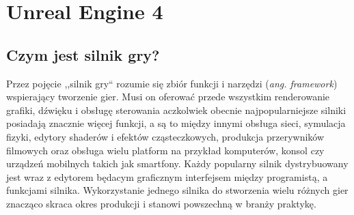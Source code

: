 \documentclass[multip]{SGGW-thesis}
\begin{document}
\chapter{Unreal Engine 4}
\section{Czym jest silnik gry?}
Przez pojęcie ,,silnik gry`` rozumie się zbiór funkcji i narzędzi ({\em ang. framework}) wspierający tworzenie gier. Musi on oferować przede wszystkim renderowanie grafiki, dźwięku i obsługę sterowania aczkolwiek obecnie najpopularniejsze silniki posiadają znacznie więcej funkcji, a są to między innymi obsługa sieci, symulacja fizyki, edytory shaderów i efektów cząsteczkowych, produkcja przerywników filmowych oraz obsługa wielu platform na przykład komputerów, konsol czy urządzeń mobilnych takich jak smartfony. Każdy popularny silnik dystrybuowany jest wraz z edytorem będacym graficznym interfejsem między programistą, a funkcjami silnika.
\newline Wykorzystanie jednego silnika do stworzenia wielu różnych gier znacząco skraca okres produkcji i stanowi powszechną w branży praktykę.\cite{learning-unreal}\cite{wiki-game-engine}
\end{document}
